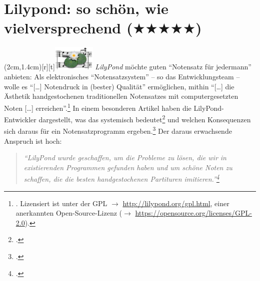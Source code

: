 %
%
%



\section{Lilypond: so schön, wie vielversprechend ($\bigstar\bigstar\bigstar\bigstar\bigstar$)}

\parpic(2cm,1.4cm)[r][t]{\includegraphics[width=2cm]{logos/lilypond-300dpi.png}}
\textit{LilyPond} möchte guten \enquote{Notensatz für jedermann} anbieten: Als
elektronisches \enquote{Notensatzsystem} -- so das Entwicklungsteam -- wolle es
\enquote{[\ldots] Notendruck in (bester) Qualität} ermöglichen, mithin
\enquote{[\ldots] die Ästhetik handgestochenen traditionellen Notensatzes mit
computergesetzten Noten [\ldots] erreichen}.\footnote{\cite[vgl.][\nopage
wp]{LilyPond2018a}. Lizensiert ist  unter der GPL $\rightarrow$
\href{http://lilypond.org/gpl.html}{http://lilypond.org/gpl.html}, einer
anerkannten Open-Source-Lizenz ($\rightarrow$
\href{https://opensource.org/licenses/GPL-2.0}
{https://opensource.org/licenses/GPL-2.0}). } In einem besonderen Artikel haben
die LilyPond-Entwickler dargestellt, was das systemisch
bedeutet\footcite[vgl.][5ff]{LilyPond2018d} und welchen Konsequenzen sich daraus
für ein Notensatzprogramm ergeben.\footcite[vgl.][8ff]{LilyPond2018d} Der daraus
erwachsende Anspruch ist hoch:

\begin{quote}\textit{\enquote{LilyPond wurde geschaffen, um die Probleme zu
lösen, die wir in existierenden Programmen gefunden haben und um schöne Noten zu
schaffen, die die besten handgestochenen Partituren
imitieren.}\footcite[vgl.][2]{LilyPond2018d} }
\end{quote}

